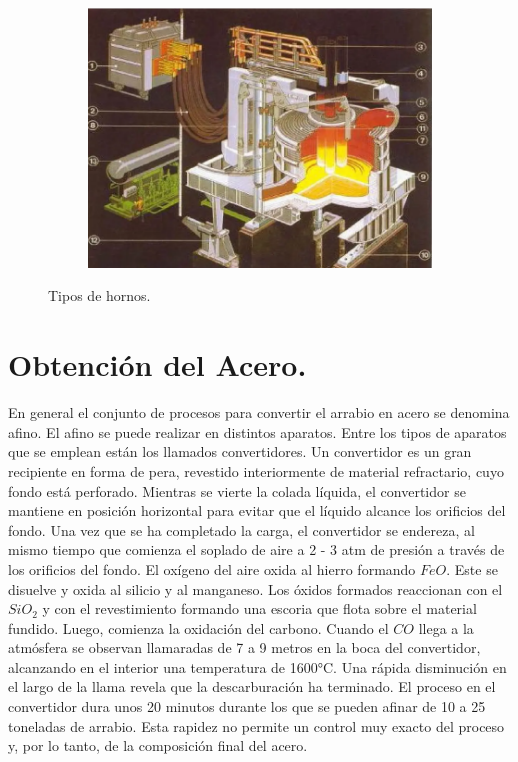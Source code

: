\documentclass[12pt,a4paper]{article}
\begin{document}
\begin{figure}[h!]
\begin{subfigure}{0.45\textwidth}
        \label{crisol}
    \end{subfigure}
    \hfill
    \begin{subfigure}{0.45\textwidth}
        \centering
        \includegraphics[width=\textwidth]{Inagenes para latex/arco electrico.png}
        \label{electrico}
    \end{subfigure}
    \caption{Tipos de hornos.}
    \label{fig:hornos}
\end{figure}

\section{Obtención del Acero.}
En general el conjunto de procesos para convertir el arrabio en acero se denomina afino. El afino se puede realizar en distintos aparatos. Entre los tipos de aparatos que se emplean están los llamados convertidores.
Un convertidor es un gran recipiente en forma de pera, revestido interiormente de material refractario, cuyo fondo está perforado. Mientras se vierte la colada líquida, el convertidor se mantiene en posición horizontal para evitar que el líquido alcance los orificios del fondo. Una vez que se ha completado la carga, el convertidor se endereza, al mismo tiempo que comienza el soplado de aire a 2 - 3 atm de presión a través de los orificios del fondo. El oxígeno del aire oxida al hierro formando $FeO$. Este se disuelve y oxida al silicio y al manganeso. Los óxidos formados reaccionan con el $SiO_2$ y con el revestimiento formando una escoria que flota sobre el material fundido. Luego, comienza la oxidación del carbono. Cuando el $CO$ llega a la atmósfera se observan llamaradas de 7 a 9 metros en la boca del convertidor, alcanzando en el interior una temperatura de 1600°C. Una rápida disminución en el largo de la llama revela que la descarburación ha terminado. El proceso en el convertidor dura unos 20 minutos durante los que se pueden afinar de 10 a 25 toneladas de arrabio. Esta rapidez no permite un control muy exacto del proceso y, por lo tanto, de la composición final del acero.
\end{document}
